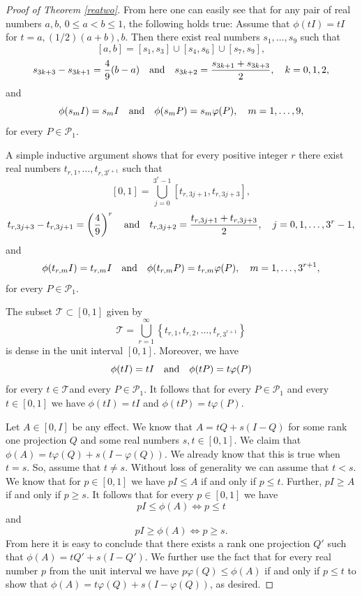 \documentclass{article}
\begin{document}
\begin{proof}[Proof of Theorem \ref{reatwo}]
From here one can easily see that 
for any pair of real numbers $a,b$, $0 \le a < b \le 1$, the following holds true: 
Assume that  $\phi (tI) = tI$ for $t= a, (1/2) (a+b), b$.
Then there exist real numbers $s_1, \ldots, s_9$ such that 
$$
[a,b] = [s_1 , s_3 ] \cup  [s_4 , s_6 ] \cup  [s_7 , s_9 ] ,
$$
$$
s_{3k+3}  - s_{3k+1} = {4 \over 9} (b-a) \ \ \ {\rm and} \ \ \ s_{3k+2} = { s_{3k+1}  + s_{3k+3} \over 2}, \ \ \ k=0,1,2,
$$
and 
$$
\phi (s_m I) = s_m I \ \ \ {\rm and} \ \ \ \phi (s_m P) = s_m \varphi (P), \ \ \ m = 1, \ldots, 9,
$$
for every $P \in \mathcal{P}_1$.

A simple inductive argument shows that for every positive integer $r$ there exist real numbers $t_{r,1}, \ldots , t_{r, 3^{r+1}}$ such that 
$$
[0,1] = \bigcup_{j=0}^{3^r-1} \left[ t_{r, 3j+1} , t_{r, 3j+3}  \right]  ,
$$
$$
t_{r, 3j+3}  - t_{r, 3j+1} = \left({4 \over 9}\right)^r \ \ \ {\rm and} \ \ \ t_{r, 3j+2} = { t_{r, 3j+1}  + t_{r, 3j+3} \over 2}, \ \ \ j=0,1,\ldots , 3^r -1,
$$
and 
$$
\phi (t_{r,m} I) = t_{r,m} I \ \ \ {\rm and} \ \ \ \phi (t_{r,m} P) = t_{r,m} \varphi (P), \ \ \ m = 1, \ldots, 3^{r+1}, 
$$
for every $P \in \mathcal{P}_1$.

The subset $\mathcal{T} \subset [0,1]$ given by
$$
\mathcal{T} = \bigcup_{r=1}^{\infty}      \left\{ t_{r,1}, t_{r,2}, \ldots , t_{r, 3^{r+1}} \right\}
$$
is dense in the unit interval $[0,1]$. Moreover, we have
$$
\phi (tI) = tI \ \ \ {\rm and} \ \ \ \phi (tP) = t \varphi (P)
$$
for every $t \in \mathcal{T}$and every $P \in \mathcal{P}_1$. It follows that for every  $P \in \mathcal{P}_1$ and every $t \in [0,1]$ we have 
$\phi (tI) = tI$ and $\phi (tP) = t \varphi (P)$.

Let $A \in [0,I]$ be any effect. We know that $A = tQ + s(I-Q)$ for some rank one projection $Q$ and some real numbers $s,t \in [0,1]$. We claim that $\phi (A) = t \varphi (Q) + s (I - \varphi (Q))$. We already know that this is true when $t=s$. So, assume that $t\not=s$. Without loss of generality we can assume that $t < s$. We know that for $p \in [0,1]$ we have $pI \le A$ if and only if $p \le t$. Further, $pI \ge A$ if and only if $p \ge s$.  It follows that for every $p \in [0,1]$ we have
$$
pI \le \phi (A) \iff p \le t 
$$
and
$$
pI \ge \phi (A) \iff p \ge s .
$$
From here it is easy to conclude that there exists a rank one projection $Q'$ such that $\phi (A) = tQ' + s(I-Q')$. We further use the fact that for every real number $p$ from the unit interval we have $p\varphi (Q) \le \phi (A)$ if and only if $p \le t$ to show that $\phi (A) = t \varphi (Q) + s (I - \varphi (Q))$, as desired.


\end{proof}
\end{document}
